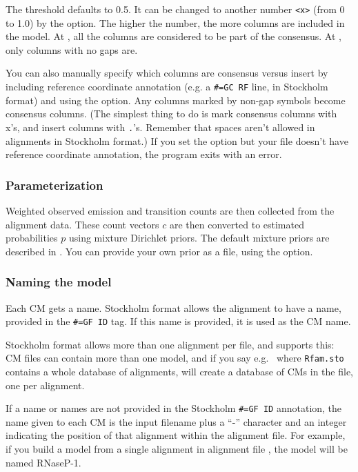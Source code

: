 The threshold defaults to 0.5. It can be changed to another number
\verb+<x>+ (from 0 to 1.0) by the  option.  The
higher the number, the more columns are included in the model.  At
, all the columns are considered to be part of
the consensus. At , only columns with no gaps are.

You can also manually specify which columns are consensus versus
insert by including reference coordinate annotation (e.g. a
\verb+#=GC RF+ line, in Stockholm format) and using the 
option. Any columns marked by non-gap symbols become consensus
columns. (The simplest thing to do is mark consensus columns with x's,
and insert columns with \verb+.+'s. Remember that spaces aren't
allowed in alignments in Stockholm format.) If you set the 
option but your file doesn't have reference coordinate annotation, the
program exits with an error.

\subsubsection{Parameterization}

Weighted observed emission and transition counts are then collected
from the alignment data. These count vectors $c$ are then converted to
estimated probabilities $p$ using mixture Dirichlet priors. The
default mixture priors are described in \cite{NawrockiEddy07}. You can
provide your own prior as a file, using the 
option.

\subsubsection{Naming the model}

Each CM gets a name. Stockholm format allows the alignment to have a
name, provided in the \verb+#=GF ID+ tag. If this name is provided,
it is used as the CM name.

Stockholm format allows more than one alignment per file, and
 supports this: CM files can contain more than one
model, and if you say e.g.\  where
\verb+Rfam.sto+ contains a whole database of alignments,
 will create a database of CMs in the  file,
one per alignment. 

If a name or names are not provided in the Stockholm \verb+#=GF ID+
annotation, the name given to each CM is the input filename plus a ``-''
character and an integer indicating the position of that alignment
within the alignment file. For example, if you build a model from a
single alignment in alignment file , the model will
be named RNaseP-1. 

